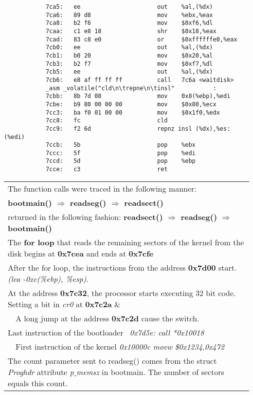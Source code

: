 \documentclass[a4paper]{article}
\begin{document}
	\begin{minipage}{0.5\textwidth}
		\begin{lstlisting}
			7ca5:	ee                   	out    %al,(%dx)
			7ca6:	89 d8                	mov    %ebx,%eax
			7ca8:	b2 f6                	mov    $0xf6,%dl
			7caa:	c1 e8 18             	shr    $0x18,%eax
			7cad:	83 c8 e0             	or     $0xffffffe0,%eax
			7cb0:	ee                   	out    %al,(%dx)
			7cb1:	b0 20                	mov    $0x20,%al
			7cb3:	b2 f7                	mov    $0xf7,%dl
			7cb5:	ee                   	out    %al,(%dx)
			7cb6:	e8 af ff ff ff       	call   7c6a <waitdisk>	
			_asm _volatile("cld\n\trepne\n\tinsl"			:
			7cbb:	8b 7d 08             	mov    0x8(%ebp),%edi
			7cbe:	b9 80 00 00 00       	mov    $0x80,%ecx
			7cc3:	ba f0 01 00 00       	mov    $0x1f0,%edx
			7cc8:	fc                   	cld    
			7cc9:	f2 6d                	repnz insl (%dx),%es:(%edi)
			7ccb:	5b                   	pop    %ebx
			7ccc:	5f                   	pop    %edi
			7ccd:	5d                   	pop    %ebp
			7cce:	c3                   	ret   
		\end{lstlisting}
	\end{minipage}
	\begin{center}
		\begin{tabularx}{0.95\textwidth}{L{1}}
			\textbullet \quad The function calls were traced in the following manner: \\
			\qquad \bfseries bootmain() $\Rightarrow$ readseg() $\Rightarrow$ readsect() \\
			\qquad returned in the following fashion: \bfseries readsect() $\Rightarrow$ readseg() $\Rightarrow$ bootmain() \\
			\textbullet \quad The \textbf{for loop} that reads the remaining sectors of the kernel from the disk begins at \textbf{0x7cea} and ends at \textbf{0x7cfe} \\
			\textbullet \quad After the for loop, the instructions from the address \textbf{0x7d00} start. \emph{(lea -0xc(\%ebp), \%esp)}. \\ 
			\textbullet \quad At the address \textbf{0x7c32}, the processor starts executing 32 bit code. Setting a bit in \emph{cr0} at \textbf{0x7c2a} \& \\ \quad ~~A long jump at the address \textbf{0x7c2d} cause the switch. \\
			\textbullet \quad Last instruction of the bootloader \quad ~\emph{0x7d5e: \qquad call *0x10018} \\ \quad ~~First instruction of the kernel \qquad \quad \emph{0x10000c \qquad movw \$0x1234,0x472} \\
			\textbullet \quad The count parameter sent to readseg() comes from the struct \emph{Proghdr} attribute \emph{p$\_$memsz} in bootmain. The number of sectors equals this count. \\
		\end{tabularx}
		\end{center}
\end{document}
